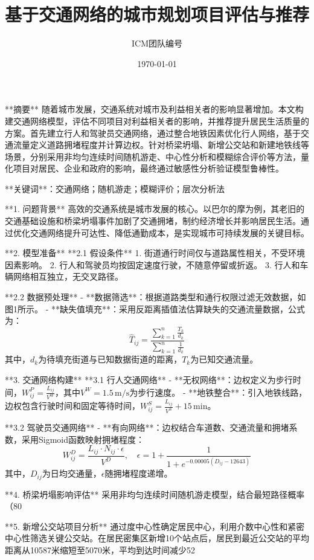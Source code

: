 \documentclass{ctexart}
\title{基于交通网络的城市规划项目评估与推荐}
\author{ICM团队编号}
\date{\today}
\begin{document}
\maketitle

 **摘要**
随着城市发展，交通系统对城市及利益相关者的影响显著增加。本文构建交通网络模型，评估不同项目对利益相关者的影响，并推荐提升居民生活质量的方案。首先建立行人和驾驶员交通网络，通过整合地铁因素优化行人网络，基于交通流量定义道路拥堵程度并计算边权。针对桥梁坍塌、新增公交站和新建地铁线等场景，分别采用非均匀连续时间随机游走、中心性分析和模糊综合评价等方法，量化项目对居民、企业和政府的影响，最终通过敏感性分析验证模型鲁棒性。

**关键词**：交通网络；随机游走；模糊评价；层次分析法


 **1. 问题背景**
高效的交通系统是城市发展的核心。以巴尔的摩为例，其老旧的交通基础设施和桥梁坍塌事件加剧了交通拥堵，制约经济增长并影响居民生活。通过优化交通网络提升可达性、降低通勤成本，是实现城市可持续发展的关键目标。


 **2. 模型准备**
 **2.1 假设条件**
1. 街道通行时间仅与道路属性相关，不受环境因素影响。
2. 行人和驾驶员均按固定速度行驶，不随意停留或折返。
3. 行人和车辆网络相互独立，无交叉路径。

 **2.2 数据预处理**
- **数据筛选**：根据道路类型和通行权限过滤无效数据，如图1所示。
- **缺失值填充**：采用反距离插值法估算缺失的交通流量数据，公式为：
  \[
  \hat{T}_{ij} = \frac{\sum_{k=1}^{n} \frac{T_k}{d_k}}{\sum_{k=1}^{n} \frac{1}{d_k}}
  \]
  其中，\(d_k\)为待填充街道与已知数据街道的距离，\(T_k\)为已知交通流量。

 **3. 交通网络构建**
**3.1 行人交通网络**
- **无权网络**：边权定义为步行时间，\(W_{ij}^P = \frac{L_{ij}}{V^W}\)，其中\(V^W = 1.5 \, \text{m/s}\)为步行速度。
- **地铁整合**：引入地铁线路，边权包含行驶时间和固定等待时间，\(W_{ij}^S = \frac{L_{ij}}{V^S} + 15 \, \text{min}\)。

**3.2 驾驶员交通网络**
- **有向网络**：边权结合车道数、交通流量和拥堵系数，采用Sigmoid函数映射拥堵程度：
  \[
  W_{ij}^D = \frac{L_{ij} \cdot N_{ij} \cdot \epsilon}{V^D}, \quad \epsilon = 1 + \frac{1}{1 + e^{-0.00005(D_{ij} - 12643)}}
  \]
  其中，\(D_{ij}\)为日均交通量，\(\epsilon\)随拥堵程度递增。


**4. 桥梁坍塌影响评估**
采用非均匀连续时间随机游走模型，结合最短路径概率（80%

 **5. 新增公交站项目分析**
通过度中心性确定居民中心，利用介数中心性和紧密中心性筛选关键公交站。在居民密集区新增10个站点后，居民到最近公交站的平均距离从10587米缩短至5070米，平均到达时间减少52%
\end{document}
